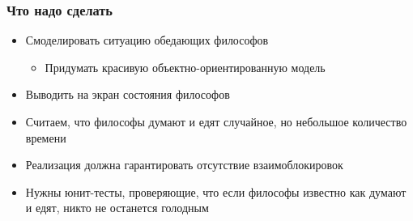 \documentclass[xetex,mathserif,serif]{beamer}
\begin{document}
	\begin{frame}
		\frametitle{Что надо сделать}
		\begin{itemize}
			\item Смоделировать ситуацию обедающих философов
			\begin{itemize}
				\item Придумать красивую объектно-ориентированную модель
			\end{itemize}
			\item Выводить на экран состояния философов
			\item Считаем, что философы думают и едят случайное, но небольшое количество времени
			\item Реализация должна гарантировать отсутствие взаимоблокировок
			\item Нужны юнит-тесты, проверяющие, что если философы известно как думают и едят, никто не останется голодным
		\end{itemize}
	\end{frame}
\end{document}
